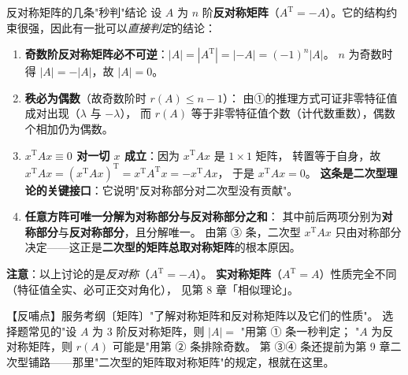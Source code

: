 \begin{fdeep}{反对称矩阵的几条"秒判"结论}
设 $A$ 为 $n$ 阶\textbf{反对称矩阵}（$A^{\mathrm{T}}=-A$）。它的结构约束很强，因此有一批可以\emph{直接判定}的结论：

\begin{enumerate}[leftmargin=2.2em,itemsep=0.25em]
\item \textbf{奇数阶反对称矩阵必不可逆}：$|A|=|A^{\mathrm{T}}|=|-A|=(-1)^{n}|A|$。
      $n$ 为奇数时得 $|A|=-|A|$，故 $|A|=0$。
\item \textbf{秩必为偶数}（故奇数阶时 $r(A)\le n-1$）：
      由①的推理方式可证非零特征值成对出现（$\lambda$ 与 $-\lambda$），
      而 $r(A)$ 等于非零特征值个数（计代数重数），偶数个相加仍为偶数。
\item \textbf{$x^{\mathrm{T}}Ax\equiv0$ 对一切 $x$ 成立}：因为 $x^{\mathrm{T}}Ax$ 是 $1\times1$ 矩阵，
      转置等于自身，故 $x^{\mathrm{T}}Ax=(x^{\mathrm{T}}Ax)^{\mathrm{T}}=x^{\mathrm{T}}A^{\mathrm{T}}x=-x^{\mathrm{T}}Ax$，
      于是 $x^{\mathrm{T}}Ax=0$。
      \textbf{这条是二次型理论的关键接口}：它说明"反对称部分对二次型没有贡献"。
\item \textbf{任意方阵可唯一分解为对称部分与反对称部分之和}：
      其中前后两项分别为\textbf{对称部分}与\textbf{反对称部分}，且分解唯一。
      由第 ③ 条，二次型 $x^{\mathrm{T}}Ax$ 只由对称部分决定——这正是\textbf{二次型的矩阵总取对称矩阵}的根本原因。
\end{enumerate}
\textbf{注意}：以上讨论的是\emph{反对称}（$A^{\mathrm{T}}=-A$）。
\textbf{实对称矩阵}（$A^{\mathrm{T}}=A$）性质完全不同（特征值全实、必可正交对角化），
见第 8 章「相似理论」。

【反哺点】服务考纲〔矩阵〕"了解对称矩阵和反对称矩阵以及它们的性质"。
选择题常见的"设 $A$ 为 3 阶反对称矩阵，则 $|A|=$ \underline{\hspace{2em}}"用第 ① 条一秒判定；
"$A$ 为反对称矩阵，则 $r(A)$ 可能是"用第 ② 条排除奇数。
第 ③④ 条还提前为第 9 章二次型铺路——那里"二次型的矩阵取对称矩阵"的规定，根就在这里。
\end{fdeep}
